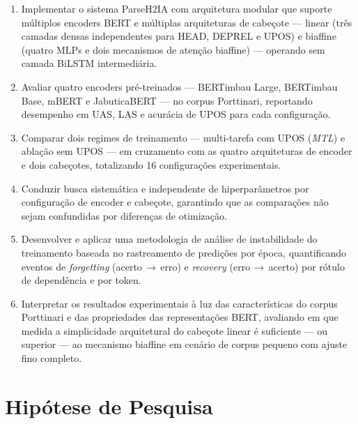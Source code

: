 \begin{enumerate}
  \item Implementar o sistema ParseH2IA com arquitetura modular que suporte múltiplos encoders
        BERT e múltiplas arquiteturas de cabeçote — linear (três camadas densas independentes
        para HEAD, DEPREL e UPOS) e biaffine (quatro MLPs e dois mecanismos de atenção biaffine)
        — operando sem camada BiLSTM intermediária.

  \item Avaliar quatro encoders pré-treinados — BERTimbau Large, BERTimbau Base,
        mBERT e JabuticaBERT — no corpus Porttinari, reportando desempenho em UAS, LAS e
        acurácia de UPOS para cada configuração.

  \item Comparar dois regimes de treinamento — multi-tarefa com UPOS (\textit{MTL}) e
        ablação sem UPOS — em cruzamento com as quatro arquiteturas de encoder e dois
        cabeçotes, totalizando 16 configurações experimentais.

  \item Conduzir busca sistemática e independente de hiperparâmetros por configuração de
        encoder e cabeçote, garantindo que as comparações não sejam confundidas por diferenças
        de otimização.

  \item Desenvolver e aplicar uma metodologia de análise de instabilidade do treinamento
        baseada no rastreamento de predições por época, quantificando eventos de
        \textit{forgetting} (acerto\,$\to$\,erro) e \textit{recovery} (erro\,$\to$\,acerto)
        por rótulo de dependência e por token.

  \item Interpretar os resultados experimentais à luz das características do corpus Porttinari
        e das propriedades das representações BERT, avaliando em que medida a simplicidade
        arquitetural do cabeçote linear é suficiente — ou superior — ao mecanismo biaffine
        em cenário de corpus pequeno com ajuste fino completo.
\end{enumerate}

\section{Hipótese de Pesquisa}
\label{sec:hipotese}


